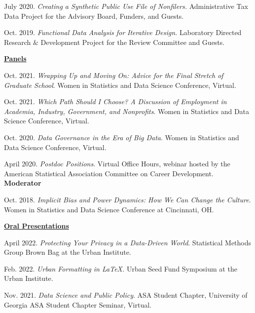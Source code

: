 \documentclass[11pt, letterpaper, roman]{moderncv} %
\begin{document}
\begin{etaremune}[topsep=0pt, itemsep=4pt, partopsep=0pt, parsep=0pt]
    \item July 2020. \textit{Creating a Synthetic Public Use File of Nonfilers.} Administrative Tax Data Project for the Advisory Board, Funders, and Guests.
    
    \item Oct. 2019. \textit{Functional Data Analysis for Iterative Design.} Laboratory Directed Research \& Development Project for the Review Committee and Guests.

\vspace{6pt}
\hspace{-0.30in}\underline{\textbf{\large Panels}}\normalsize
    \item Oct. 2021. \textit{Wrapping Up and Moving On: Advice for the Final Stretch of Graduate School}. Women in Statistics and Data Science Conference, Virtual.
    
    \item Oct. 2021. \textit{Which Path Should I Choose? A Discussion of Employment in Academia, Industry, Government, and Nonprofits}. Women in Statistics and Data Science Conference, Virtual.
    
    \item Oct. 2020. \textit{Data Governance in the Era of Big Data}. Women in Statistics and Data Science Conference, Virtual.
    
    \item April 2020. \textit{Postdoc Positions}. Virtual Office Hours, webinar hosted by the American Statistical Association Committee on Career Development. \textbf{Moderator}
    
    \item Oct. 2018. \textit{Implicit Bias and Power Dynamics: How We Can Change the Culture}. Women in Statistics and Data Science Conference at Cincinnati, OH.
    
\vspace{6pt}
\hspace{-0.30in}\underline{\textbf{\large Oral Presentations}}\normalsize
    \item April 2022. \textit{Protecting Your Privacy in a Data-Driven World}. Statistical Methods Group Brown Bag at the Urban Institute.
    
    \item Feb. 2022. \textit{Urban Formatting in LaTeX.} Urban Seed Fund Symposium at the Urban Institute.

    \item Nov. 2021. \textit{Data Science and Public Policy}. ASA Student Chapter, University of Georgia ASA Student Chapter Seminar, Virtual.
    

\end{etaremune}
\end{document}
